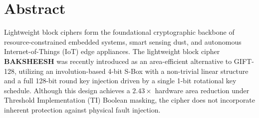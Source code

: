 \documentclass[12pt,a4paper,oneside]{report}
\begin{document}
\cleardoublepage

\chapter*{Abstract}

Lightweight block ciphers form the foundational cryptographic backbone of resource-constrained embedded systems, smart sensing dust, and autonomous Internet-of-Things (IoT) edge appliances. The lightweight block cipher \textbf{BAKSHEESH} was recently introduced as an area-efficient alternative to GIFT-128, utilizing an involution-based 4-bit S-Box with a non-trivial linear structure and a full 128-bit round key injection driven by a single 1-bit rotational key schedule. Although this design achieves a $2.43\times$ hardware area reduction under Threshold Implementation (TI) Boolean masking, the cipher does not incorporate inherent protection against physical fault injection.
\end{document}
